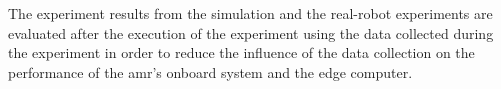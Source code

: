 The experiment results from the simulation and the real-robot experiments are evaluated after the execution of the experiment using the data collected during the experiment in order to reduce the influence of the data collection on the performance of the \gls{amr}'s onboard system and the edge computer.


